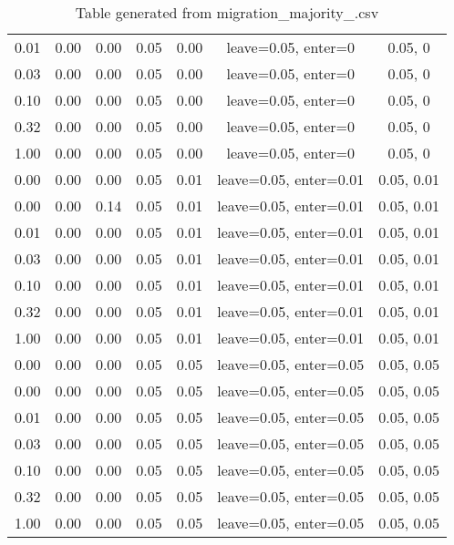 \begin{table}[ht]
\begin{table}[ht]
\begin{tabular}{|ccccccc}
  0.01 & 0.00 & 0.00 & 0.05 & 0.00 & leave=0.05, enter=0 & 0.05, 0 \\ 
  0.03 & 0.00 & 0.00 & 0.05 & 0.00 & leave=0.05, enter=0 & 0.05, 0 \\ 
  0.10 & 0.00 & 0.00 & 0.05 & 0.00 & leave=0.05, enter=0 & 0.05, 0 \\ 
  0.32 & 0.00 & 0.00 & 0.05 & 0.00 & leave=0.05, enter=0 & 0.05, 0 \\ 
  1.00 & 0.00 & 0.00 & 0.05 & 0.00 & leave=0.05, enter=0 & 0.05, 0 \\ 
  0.00 & 0.00 & 0.00 & 0.05 & 0.01 & leave=0.05, enter=0.01 & 0.05, 0.01 \\ 
  0.00 & 0.00 & 0.14 & 0.05 & 0.01 & leave=0.05, enter=0.01 & 0.05, 0.01 \\ 
  0.01 & 0.00 & 0.00 & 0.05 & 0.01 & leave=0.05, enter=0.01 & 0.05, 0.01 \\ 
  0.03 & 0.00 & 0.00 & 0.05 & 0.01 & leave=0.05, enter=0.01 & 0.05, 0.01 \\ 
  0.10 & 0.00 & 0.00 & 0.05 & 0.01 & leave=0.05, enter=0.01 & 0.05, 0.01 \\ 
  0.32 & 0.00 & 0.00 & 0.05 & 0.01 & leave=0.05, enter=0.01 & 0.05, 0.01 \\ 
  1.00 & 0.00 & 0.00 & 0.05 & 0.01 & leave=0.05, enter=0.01 & 0.05, 0.01 \\ 
  0.00 & 0.00 & 0.00 & 0.05 & 0.05 & leave=0.05, enter=0.05 & 0.05, 0.05 \\ 
  0.00 & 0.00 & 0.00 & 0.05 & 0.05 & leave=0.05, enter=0.05 & 0.05, 0.05 \\ 
  0.01 & 0.00 & 0.00 & 0.05 & 0.05 & leave=0.05, enter=0.05 & 0.05, 0.05 \\ 
  0.03 & 0.00 & 0.00 & 0.05 & 0.05 & leave=0.05, enter=0.05 & 0.05, 0.05 \\ 
  0.10 & 0.00 & 0.00 & 0.05 & 0.05 & leave=0.05, enter=0.05 & 0.05, 0.05 \\ 
  0.32 & 0.00 & 0.00 & 0.05 & 0.05 & leave=0.05, enter=0.05 & 0.05, 0.05 \\ 
  1.00 & 0.00 & 0.00 & 0.05 & 0.05 & leave=0.05, enter=0.05 & 0.05, 0.05 \\ 
   \hline
\end{tabular}
\caption{Table generated from migration_majority_.csv} 
\end{table}
\end{table}
